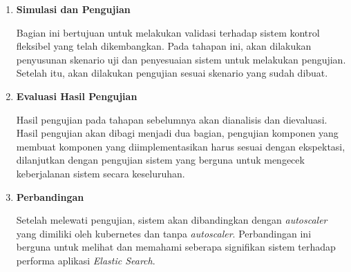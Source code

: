 \begin{enumerate}
\begin{enumerate}

        

        

        

        \item \textbf{Simulasi dan Pengujian}
        
        Bagian ini bertujuan untuk melakukan validasi terhadap sistem kontrol fleksibel yang telah dikembangkan. Pada tahapan ini, akan dilakukan penyusunan skenario uji dan penyesuaian sistem untuk melakukan pengujian. Setelah itu, akan dilakukan pengujian sesuai skenario yang sudah dibuat.
    
        \item \textbf{Evaluasi Hasil Pengujian}
        
        Hasil pengujian pada tahapan sebelumnya akan dianalisis dan dievaluasi. Hasil pengujian akan dibagi menjadi dua bagian, pengujian komponen yang membuat komponen yang diimplementasikan harus sesuai dengan ekspektasi, dilanjutkan dengan pengujian sistem yang berguna untuk mengecek keberjalanan sistem secara keseluruhan.

        \item \textbf{Perbandingan}
        
        Setelah melewati pengujian, sistem akan dibandingkan dengan \textit{autoscaler} yang dimiliki oleh kubernetes dan tanpa \textit{autoscaler}. Perbandingan ini berguna untuk melihat dan memahami seberapa signifikan sistem terhadap performa aplikasi \textit{Elastic Search}.
    \end{enumerate}
\end{enumerate}
